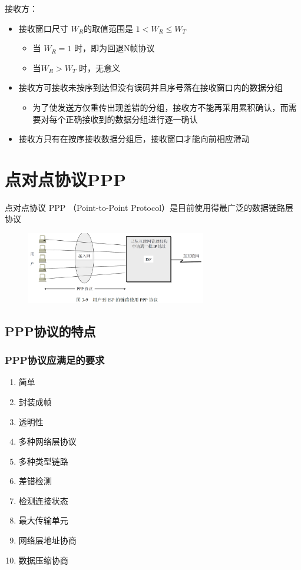 \documentclass[cs4size,a4paper,10pt]{ctexart}
\begin{document}
	接收方：
	\begin{itemize}
		\item 接收窗口尺寸 $W_R$​​ 的取值范围是 $1<W_R\leq W_T$
		\begin{itemize}
			\item 当 $W_R=1$ 时，即为回退N帧协议
			\item 当$W_R > W_T$ 时，无意义
		\end{itemize}
		\item 接收方可接收未按序到达但没有误码并且序号落在接收窗口内的数据分组
		\begin{itemize}
			\item 为了使发送方仅重传出现差错的分组，接收方不能再采用累积确认，而需要对每个正确接收到的数据分组进行逐一确认
		\end{itemize}
		\item 接收方只有在按序接收数据分组后，接收窗口才能向前相应滑动
	\end{itemize}

	\section{点对点协议PPP}
	点对点协议 PPP （Point-to-Point Protocol）是目前使用得最广泛的数据链路层协议
	\begin{figure}[H]
		\centering
		\includegraphics[width=0.7\textwidth]{img/3.9}
	\end{figure}

	\subsection{PPP协议的特点}

	\subsubsection{PPP协议应满足的要求}
	\begin{multicols}{4}
		\begin{enumerate}[label=\arabic*.]
			\item 简单
			\item 封装成帧
			\item 透明性
			\item 多种网络层协议
			\item 多种类型链路
			\item 差错检测
			\item 检测连接状态
			\item 最大传输单元
			\item 网络层地址协商
			\item 数据压缩协商
		\end{enumerate}
	\end{multicols}
\end{document}
